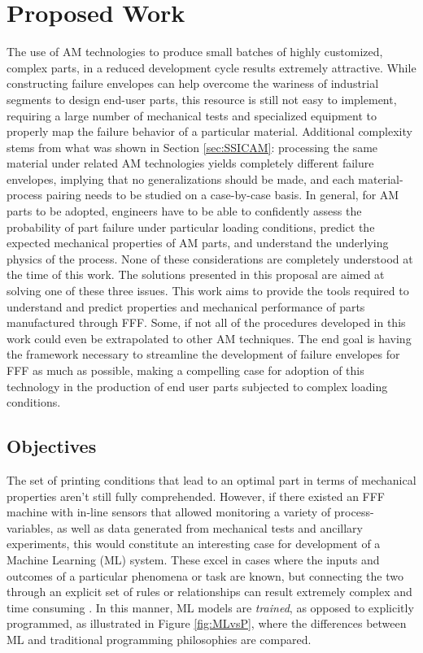 \documentclass[main.tex]{subfiles}
\begin{document}
\chapter{Proposed Work} \label{ch:proposal}

The use of AM technologies to produce small batches of highly customized, complex parts, in a reduced development cycle results extremely attractive. While constructing failure envelopes can help overcome the wariness of industrial segments to design end-user parts, this resource is still not easy to implement, requiring a large number of mechanical tests and specialized equipment to properly map the failure behavior of a particular material. Additional complexity stems from what was shown in Section \ref{sec:SSICAM}: processing the same material under related AM technologies yields completely different failure envelopes, implying that no generalizations should be made, and each material-process pairing needs to be studied on a case-by-case basis. In general, for AM parts to be adopted, engineers have to be able to confidently assess the probability of part failure under particular loading conditions, predict the expected mechanical properties of AM parts, and understand the underlying physics of the process. None of these considerations are completely understood at the time of this work. The solutions presented in this proposal are aimed at solving one of these three issues. This work aims to provide the tools required to understand and predict properties and mechanical performance of parts manufactured through FFF. Some, if not all of the procedures developed in this work could even be extrapolated to other AM techniques. The end goal is having the framework necessary to streamline the development of failure envelopes for FFF as much as possible, making a compelling case for adoption of this technology in the production of end user parts subjected to complex loading conditions. 

\section{Objectives} \label{sec:objectives}

The set of printing conditions that lead to an optimal part in terms of mechanical properties aren't still fully comprehended. However, if there existed an FFF machine with in-line sensors that allowed monitoring a variety of process-variables, as well as data generated from mechanical tests and ancillary experiments, this would constitute an interesting case for development of a Machine Learning (ML) system. These excel in cases where the inputs and outcomes of a particular phenomena or task are known, but connecting the two through an explicit set of rules or relationships can result extremely complex and time consuming \cite{Chollet2018}. In this manner, ML models are \emph{trained}, as opposed to explicitly programmed, as illustrated in Figure \ref{fig:MLvsP}, where the differences between ML and traditional programming philosophies are compared. 
\end{document}
